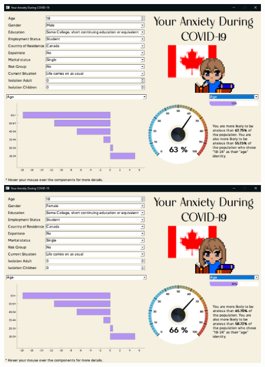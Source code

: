 \documentclass[fontsize=11pt]{article}
\begin{document}
    \begin{center}
        \includegraphics[scale=0.30]{img/male_student_screenshot}
        \includegraphics[scale=0.30]{img/female_student_screenshot}
    \end{center}
\end{document}
